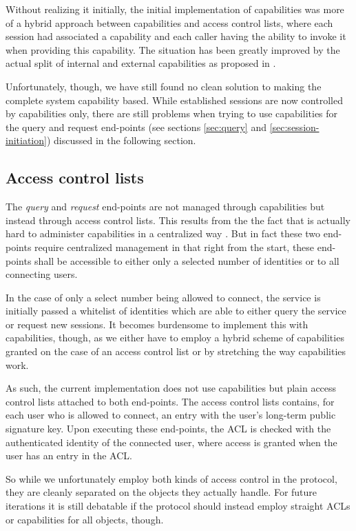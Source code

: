 Without realizing it initially, the initial implementation of capabilities was more of a hybrid approach between capabilities and access control lists, where each session had associated a capability and each caller having the ability to invoke it when providing this capability.
The situation has been greatly improved by the actual split of internal and external capabilities as proposed in \cite{gong1989secure}.

Unfortunately, though, we have still found no clean solution to making the complete system capability based.
While established sessions are now controlled by capabilities only, there are still problems when trying to use capabilities for the query and request end-points (see sections \ref{sec:query} and \ref{sec:session-initiation}) discussed in the following section.

\subsection{Access control lists}

The \emph{query} and \emph{request} end-points are not managed through capabilities but instead through access control lists.
This results from the the fact that is actually hard to administer capabilities in a centralized way \cite{shapiro1999eros}.
But in fact these two end-points require centralized management in that right from the start, these end-points shall be accessible to either only a selected number of identities or to all connecting users.

In the case of only a select number being allowed to connect, the service is initially passed a whitelist of identities which are able to either query the service or request new sessions.
It becomes burdensome to implement this with capabilities, though, as we either have to employ a hybrid scheme of capabilities granted on the case of an access control list or by stretching the way capabilities work.

As such, the current implementation does not use capabilities but plain access control lists attached to both end-points.
The access control lists contains, for each user who is allowed to connect, an entry with the user's long-term public signature key.
Upon executing these end-points, the ACL is checked with the authenticated identity of the connected user, where access is granted when the user has an entry in the ACL.

So while we unfortunately employ both kinds of access control in the protocol, they are cleanly separated on the objects they actually handle.
For future iterations it is still debatable if the protocol should instead employ straight ACLs or capabilities for all objects, though.

